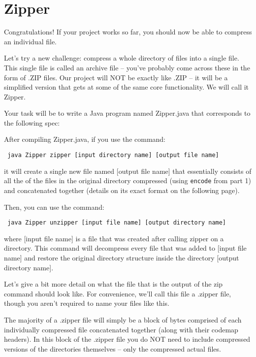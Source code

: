 \documentclass[11pt]{article}
\begin{document}
\section{Zipper}
Congratulations! If your project works so far, you should now be able to compress an individual file. 

Let's try a new challenge: compress a whole directory of files into a single file. This single file is called an archive file -- you've probably come across these in the form of .ZIP files. Our project will NOT be exactly like .ZIP -- it will be a simplified version that gets at some of the same core functionality. We will call it Zipper. 

Your task will be to write a Java program named Zipper.java that corresponds to the following spec: 

After compiling Zipper.java, if you use the command:
\begin{center}
\texttt{
    java Zipper zipper [input directory name] [output file name]
}
\end{center}

it will create a single new file named [output file name] that essentially consists of all the of the files in the original directory compressed (using \texttt{encode} from part 1) and concatenated together (details on its exact format on the following page).

Then, you can use the command:
\begin{center}
\texttt{
    java Zipper unzipper [input file name] [output directory name]
}
\end{center}

where [input file name] is a file that was created after calling zipper on a directory. This command will decompress every file that was added to [input file name] and restore the original directory structure inside the directory [output directory name].

Let's give a bit more detail on what the file that is the output of the zip command should look like. For convenience, we'll call this file a .zipper file, though you aren't required to name your files like this.

The majority of a .zipper file will simply be a block of bytes comprised of each individually compressed file concatenated together (along with their codemap headers). In this block of the .zipper file you do NOT need to include compressed versions of the directories themselves -- only the compressed actual files.
\end{document}
